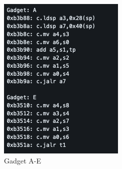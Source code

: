 \begin{figure}[!htb]
  \includegraphics[width=\linewidth]{images/gadget-1.png}
  \caption{Gadget A-E}
\endminipage\hfill
{}

\end{figure}
